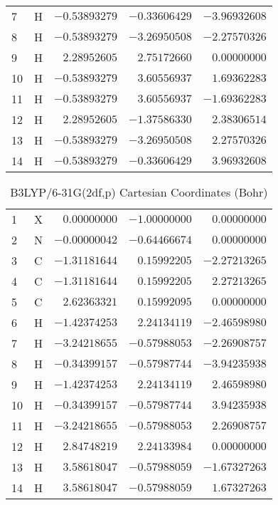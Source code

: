 \documentclass[10pt,oneside]{article}
\begin{document}
\begin{table}[h!]
\begin{multicols}{2}
\begin{tabular}{llrrr}
7  & H  & $-0.53893279$ & $-0.33606429$ & $-3.96932608$ \\
8  & H  & $-0.53893279$ & $-3.26950508$ & $-2.27570326$ \\
9  & H  & $ 2.28952605$ & $ 2.75172660$ & $ 0.00000000$ \\
10 & H  & $-0.53893279$ & $ 3.60556937$ & $ 1.69362283$ \\
11 & H  & $-0.53893279$ & $ 3.60556937$ & $-1.69362283$ \\
12 & H  & $ 2.28952605$ & $-1.37586330$ & $ 2.38306514$ \\
13 & H  & $-0.53893279$ & $-3.26950508$ & $ 2.27570326$ \\
14 & H  & $-0.53893279$ & $-0.33606429$ & $ 3.96932608$ \\
\bottomrule
\end{tabular}
\end{multicols}
\end{table}

\begin{table}[h]
\centering
\caption{B3LYP/6-31G(2df,p) Cartesian Coordinates (Bohr)}
\begin{tabular}{llrrr}
\toprule
1  & X  & $ 0.00000000$ & $-1.00000000$ & $ 0.00000000$ \\
2  & N  & $-0.00000042$ & $-0.64466674$ & $ 0.00000000$ \\
3  & C  & $-1.31181644$ & $ 0.15992205$ & $-2.27213265$ \\
4  & C  & $-1.31181644$ & $ 0.15992205$ & $ 2.27213265$ \\
5  & C  & $ 2.62363321$ & $ 0.15992095$ & $ 0.00000000$ \\
6  & H  & $-1.42374253$ & $ 2.24134119$ & $-2.46598980$ \\
7  & H  & $-3.24218655$ & $-0.57988053$ & $-2.26908757$ \\
8  & H  & $-0.34399157$ & $-0.57987744$ & $-3.94235938$ \\
9  & H  & $-1.42374253$ & $ 2.24134119$ & $ 2.46598980$ \\
10 & H  & $-0.34399157$ & $-0.57987744$ & $ 3.94235938$ \\
11 & H  & $-3.24218655$ & $-0.57988053$ & $ 2.26908757$ \\
12 & H  & $ 2.84748219$ & $ 2.24133984$ & $ 0.00000000$ \\
13 & H  & $ 3.58618047$ & $-0.57988059$ & $-1.67327263$ \\
14 & H  & $ 3.58618047$ & $-0.57988059$ & $ 1.67327263$ \\
\bottomrule
\end{tabular}
\end{table}
\end{document}
